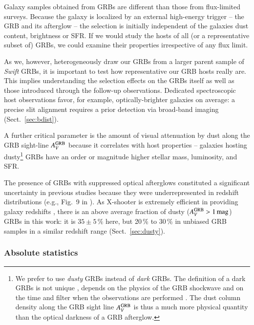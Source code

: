 \documentclass[traditabstract, longauth]{aa}
\begin{document}
 {Galaxy samples obtained from GRBs are different than those from flux-limited surveys. Because the galaxy is localized by an external high-energy trigger -- the GRB and its afterglow -- the selection is initially independent of the galaxies dust content, brightness or SFR. If we would study the hosts of all (or a representative subset of) GRBs, we could examine their properties irrespective of any flux limit.}

 {As we, however, heterogeneously draw our GRBs from a larger parent sample of \textit{Swift} GRBs, it is important to test how representative our GRB hosts really are. This implies understanding the selection effects on the GRBs itself as well as those introduced through the follow-up observations. Dedicated spectroscopic host observations favor, for example, optically-brighter galaxies on average: a precise slit alignment requires a prior detection via broad-band imaging (Sect.~\ref{sec:bdist}).}

A further critical parameter is the amount of visual attenuation by dust along the GRB sight-line $A^{\rm{GRB}}_V$ \citep{2011A&A...534A.108K, 2012ApJ...756..187H, 2013ApJ...778..128P, 2015ApJ...801..102P} because it correlates with host properties -- galaxies hosting dusty\footnote{We prefer to use \textit{dusty} GRBs instead of \textit{dark} GRBs. The definition of a dark GRBs is not unique \citep{2004ApJ...617L..21J, 2009ApJ...699.1087V}, depends on the physics of the GRB shockwave and on the time and filter when the observations are performed \citep{2011A&A...526A..30G}. The dust column density along the GRB sight line  $A^{\rm{GRB}}_V$ is thus a much more physical quantity than the optical darkness of a GRB afterglow.} GRBs have an order or magnitude higher stellar mass, luminosity, and SFR. 

The presence of GRBs with suppressed optical afterglows \citep[e.g.,][]{1998ApJ...493L..27G, 2006ApJ...647..471L} constituted a significant uncertainty in previous studies because they were underrepresented in redshift distributions (e.g., Fig.~9 in \citealp{2012ApJ...756..187H}). As X-shooter is extremely efficient in providing galaxy redshifts \citep{2012ApJ...758...46K}, there is an above average fraction of dusty ($A^{\rm{GRB}}_V>1\,\rm{mag}$) GRBs in this work: it is $35\pm5\,\%$  here, but 20\,\% to 30\,\% in unbiased GRB samples \citep{2011A&A...526A..30G, 2012MNRAS.421.1265M, 2014arXiv1412.6530L} in a similar redshift range (Sect.~\ref{sec:dusty}).

\subsubsection{Absolute statistics}
\label{sec:absstat}
\end{document}

